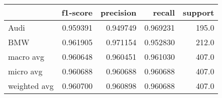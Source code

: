 \begin{tabular}{lrrrr}
\toprule
{} &  f1-score &  precision &    recall &  support \\
\midrule
Audi         &  0.959391 &   0.949749 &  0.969231 &    195.0 \\
BMW          &  0.961905 &   0.971154 &  0.952830 &    212.0 \\
macro avg    &  0.960648 &   0.960451 &  0.961030 &    407.0 \\
micro avg    &  0.960688 &   0.960688 &  0.960688 &    407.0 \\
weighted avg &  0.960700 &   0.960898 &  0.960688 &    407.0 \\
\bottomrule
\end{tabular}
